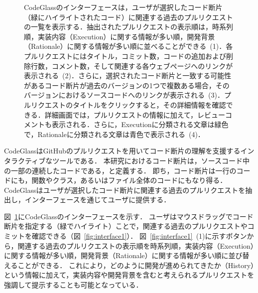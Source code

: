 \begin{figure}[t]
\begin{minipage}{0.49\textwidth}
\end{minipage}
	\caption{CodeGlassのインターフェースは，ユーザが選択したコード断片（緑にハイライトされたコード）に関連する過去のプルリクエストの一覧を表示する．抽出されたプルリクエストの表示順は，時系列順，実装内容（Execution）に関する情報が多い順，開発背景（Rationale）に関する情報が多い順に並べることができる~(1)．各プルリクエストにはタイトル，コミット数，コードの追加および削除行数，コメント数，そして関連する各ウェブページへのリンクが表示される~(2)．さらに，選択されたコード断片と一致する可能性があるコード断片が過去のバージョンの1つで複数ある場合，そのバージョンにおけるソースコードへのリンクが表示される~(3)．プルリクエストのタイトルをクリックすると，その詳細情報を確認できる．詳細画面では，プルリクエストの情報に加えて，レビューコメントも表示される．さらに，Executionに分類される文章は緑色で，Rationaleに分類される文章は青色で表示される~(4)．}
    \label{fig:WebInterface}
\end{figure}


CodeGlassはGitHubのプルリクエストを用いてコード断片の理解を支援するインタラクティブなツールである．
本研究におけるコード断片は，ソースコード中の一部の連続したコードである，と定義する．
即ち，コード断片は一行のコードにも，関数やクラス，あるいはファイル全体のコードにもなり得る．
CodeGlassはユーザが選択したコード断片に関連する過去のプルリクエストを抽出し，インターフェースを通じてユーザに提供する．




図~\ref{fig:WebInterface}にCodeGlassのインターフェースを示す．
ユーザはマウスドラッグでコード断片を指定する（緑でハイライト）ことで，関連する過去のプルリクエストやコミットを確認できる（図~\ref{fig:interface1}）．
図~\ref{fig:interface1}~(1)に示すボタンから，関連する過去のプルリクエストの表示順を時系列順，実装内容（Execution）に関する情報が多い順，開発背景（Rationale）に関する情報が多い順に並び替えることができる．
これにより，どのように開発が進められてきたか（History）という情報に加えて，実装内容や開発背景を含むと考えられるプルリクエストを強調して提示することも可能となっている．

